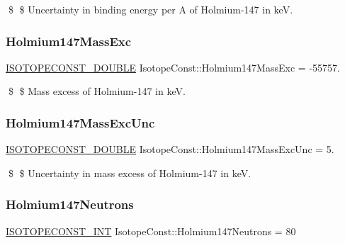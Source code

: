 \$ \$ Uncertainty in binding energy per A of Holmium-\/147 in keV. \mbox{\label{group___isotope_const-_holmium-_ho147_ga240926e541e003833dde549eef70f60c}} 
\subsubsection{\texorpdfstring{Holmium147\+Mass\+Exc}{Holmium147MassExc}}
{\footnotesize\ttfamily \mbox{\hyperlink{group___isotope_const-_macros_ga8f45a7272ce02c0b4c65c44636ed719a}{I\+S\+O\+T\+O\+P\+E\+C\+O\+N\+S\+T\+\_\+\+D\+O\+U\+B\+LE}} Isotope\+Const\+::\+Holmium147\+Mass\+Exc = -\/55757.}

\$ \$ Mass excess of Holmium-\/147 in keV. \mbox{\label{group___isotope_const-_holmium-_ho147_gaf49be4db8aa675a1004cf4bf979090de}} 
\subsubsection{\texorpdfstring{Holmium147\+Mass\+Exc\+Unc}{Holmium147MassExcUnc}}
{\footnotesize\ttfamily \mbox{\hyperlink{group___isotope_const-_macros_ga8f45a7272ce02c0b4c65c44636ed719a}{I\+S\+O\+T\+O\+P\+E\+C\+O\+N\+S\+T\+\_\+\+D\+O\+U\+B\+LE}} Isotope\+Const\+::\+Holmium147\+Mass\+Exc\+Unc = 5.}

\$ \$ Uncertainty in mass excess of Holmium-\/147 in keV. \mbox{\label{group___isotope_const-_holmium-_ho147_ga40a30e41ace2ebe9cd568cae5c49c37b}} 
\subsubsection{\texorpdfstring{Holmium147\+Neutrons}{Holmium147Neutrons}}
{\footnotesize\ttfamily \mbox{\hyperlink{group___isotope_const-_macros_ga5f18360b3e99483a35c32d789e62621c}{I\+S\+O\+T\+O\+P\+E\+C\+O\+N\+S\+T\+\_\+\+I\+NT}} Isotope\+Const\+::\+Holmium147\+Neutrons = 80}

